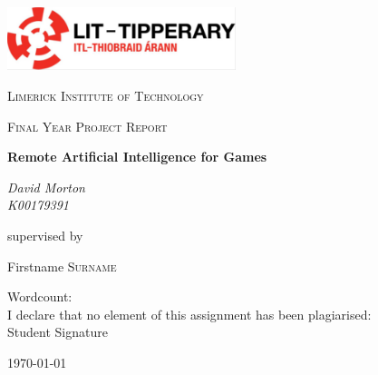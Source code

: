 \documentclass[12pt,a4paper]{report}
\begin{document}
\begin{titlepage}
	\centering
	\includegraphics[width=0.5\textwidth]{Figures/lit_logo.jpg}\par\vspace{1cm}
	{\scshape\LARGE Limerick Institute of Technology \par}
	\vspace{1cm}
	{\scshape\Large Final Year Project Report\par}
	\vspace{1.5cm}
	{\huge\bfseries Remote Artificial Intelligence for Games\par}
	\vspace{2cm}
	{\Large\itshape David Morton\\K00179391\par}
	\vfill
	supervised by\par
	Firstname \textsc{Surname}

	\vfill

Wordcount:\\
\bigskip
I declare that no element of this assignment has been plagiarised:\\
Student Signature

\bigskip

	{\large \today\par}
\end{titlepage}
\end{document}
